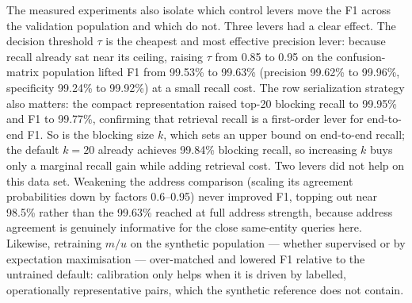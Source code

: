 \documentclass[conference]{IEEEtran}
\begin{document}
The measured experiments also isolate which control levers move the F1 across the validation population and which do not. Three levers had a clear effect. The decision threshold $\tau$ is the cheapest and most effective precision lever: because recall already sat near its ceiling, raising $\tau$ from 0.85 to 0.95 on the confusion-matrix population lifted F1 from 99.53\% to 99.63\% (precision 99.62\% to 99.96\%, specificity 99.24\% to 99.92\%) at a small recall cost. The row serialization strategy also matters: the compact representation raised top-20 blocking recall to 99.95\% and F1 to 99.77\%, confirming that retrieval recall is a first-order lever for end-to-end F1. So is the blocking size $k$, which sets an upper bound on end-to-end recall; the default $k=20$ already achieves 99.84\% blocking recall, so increasing $k$ buys only a marginal recall gain while adding retrieval cost. Two levers did not help on this data set. Weakening the address comparison (scaling its agreement probabilities down by factors 0.6--0.95) never improved F1, topping out near 98.5\% rather than the 99.63\% reached at full address strength, because address agreement is genuinely informative for the close same-entity queries here. Likewise, retraining $m/u$ on the synthetic population --- whether supervised or by expectation maximisation --- over-matched and lowered F1 relative to the untrained default: calibration only helps when it is driven by labelled, operationally representative pairs, which the synthetic reference does not contain.
\end{document}
